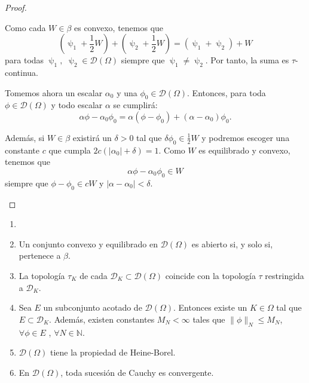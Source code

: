 \begin{proof}
\begin{enumerate}
Como cada $W\in\beta$ es convexo, tenemos que 
\begin{equation}
(\uppsi_{1} + \frac{1}{2}W) + (\uppsi_{2} + \frac{1}{2}W) = (\uppsi_{1}+\uppsi_{2}) + W
\end{equation}
para todas $\uppsi_{1},$ $\uppsi_{2}\in \mathcal{D}(\Omega)$ siempre que $\uppsi_{1} \neq \uppsi_{2}$. Por tanto, la suma es $\tau$-continua.

Tomemos ahora un escalar $\alpha_{0}$ y una $\phi_{0}\in\mathcal{D}(\Omega)$.  Entonces, para toda $\phi\in \mathcal{D}(\Omega)$ y todo escalar $\alpha$ se cumplirá:
\begin{equation}
\alpha\phi - \alpha_{0}\phi_{0} = \alpha(\phi - \phi_{0}) + (\alpha - \alpha_{0})\phi_{0}.
\end{equation}

Además, si $W\in\beta$ existirá un $\delta>0$ tal que $\delta\phi_{0}\in\frac{1}{2}W$ y podremos escoger una constante $c$ que cumpla $2c(\vert\alpha_{0}\vert + \delta)=1$. Como $W$ es equilibrado y convexo, tenemos que
\begin{equation}
\alpha\phi - \alpha_{0}\phi_{0} \in W
\end{equation}
siempre que $\phi - \phi_{0}\in cW$ y $\vert \alpha - \alpha_{0} \vert < \delta$.
\end{enumerate} 
\end{proof}

\begin{teorema}
\begin{enumerate}
\item[]
\item Un conjunto convexo y equilibrado en $\mathcal{D}(\Omega)$ es abierto si, y solo si, pertenece a $\beta$.
\item La topología $\tau_{K}$ de cada $\mathcal{D}_{K}\subset\mathcal{D}(\Omega)$ coincide con la topología $\tau$ restringida a $\mathcal{D}_{K}$.
\item Sea $E$ un subconjunto acotado de $\mathcal{D}(\Omega)$. Entonces existe un $K\in\Omega$ tal que $E\subset\mathcal{D}_{K}$. Además, existen constantes $M_{N}<\infty$ tales que $\parallel \phi \parallel_{N} \leq M_{N}$, $\forall \phi\in E$ , $\forall N\in\mathds{N}$. 
\item $\mathcal{D}(\Omega)$ tiene la propiedad de Heine-Borel.
\item En $\mathcal{D}(\Omega)$, toda sucesión de Cauchy es convergente. 
\end{enumerate}
\end{teorema}